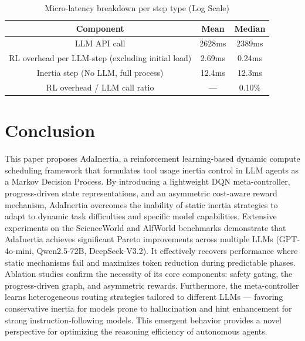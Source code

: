 \documentclass[runningheads]{llncs}
\begin{document}
\begin{table}[htb]
    \centering
    \small
    \caption{Micro-latency breakdown per step type (Log Scale)}
    \label{tab:table3}
    \begin{tabular}{|c|c|c|}
    \hline
    Component & Mean & Median\\
    \hline
    LLM API call & 2628ms & 2389ms\\
    \hline
    RL overhead per LLM-step (excluding initial load) & 2.69ms & 0.24ms\\
    \hline
    Inertia step (No LLM, full process) & 12.4ms & 12.3ms\\
    \hline
    RL overhead / LLM call ratio & — & 0.10\%\\
    \hline
    \end{tabular}
\end{table}
\section{Conclusion}
This paper proposes AdaInertia, a reinforcement learning-based dynamic compute scheduling framework that formulates tool usage inertia control in LLM agents as a Markov Decision Process. By introducing a lightweight DQN meta-controller, progress-driven state representations, and an asymmetric cost-aware reward mechanism, AdaInertia overcomes the inability of static inertia strategies to adapt to dynamic task difficulties and specific model capabilities. Extensive experiments on the ScienceWorld and AlfWorld benchmarks demonstrate that AdaInertia achieves significant Pareto improvements across multiple LLMs (GPT-4o-mini, Qwen2.5-72B, DeepSeek-V3.2). It effectively recovers performance where static mechanisms fail and maximizes token reduction during predictable phases. Ablation studies confirm the necessity of its core components: safety gating, the progress-driven graph, and asymmetric rewards. Furthermore, the meta-controller learns heterogeneous routing strategies tailored to different LLMs — favoring conservative inertia for models prone to hallucination and hint enhancement for strong instruction-following models. This emergent behavior provides a novel perspective for optimizing the reasoning efficiency of autonomous agents.
\end{document}
